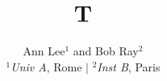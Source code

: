 \documentclass{article}
\begin{document}
\title{T}
\author{Ann Lee$^{1}$ and Bob Ray$^{2}$\\
\textit{$^1$Univ A}, Rome $|$ \textit{$^2$Inst B}, Paris}
\maketitle
\end{document}
